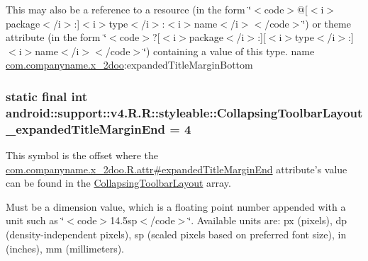This may also be a reference to a resource (in the form \char`\"{}$<$code$>$@\mbox{[}$<$i$>$package$<$/i$>$:\mbox{]}$<$i$>$type$<$/i$>$:$<$i$>$name$<$/i$>$$<$/code$>$\char`\"{}) or theme attribute (in the form \char`\"{}$<$code$>$?\mbox{[}$<$i$>$package$<$/i$>$:\mbox{]}\mbox{[}$<$i$>$type$<$/i$>$:\mbox{]}$<$i$>$name$<$/i$>$$<$/code$>$\char`\"{}) containing a value of this type.  name \hyperlink{namespacecom_1_1companyname_1_1x__2doo}{com.companyname.x\_\-2doo}:expandedTitleMarginBottom \hypertarget{classandroid_1_1support_1_1v4_1_1_r_1_1styleable_51a799757acf71b646e197b66d32c630}{
\subsubsection[{CollapsingToolbarLayout\_\-expandedTitleMarginEnd}]{\setlength{\rightskip}{0pt plus 5cm}static final int android::support::v4.R.R::styleable::CollapsingToolbarLayout\_\-expandedTitleMarginEnd = 4}}
\label{classandroid_1_1support_1_1v4_1_1_r_1_1styleable_51a799757acf71b646e197b66d32c630}


This symbol is the offset where the \hyperlink{classcom_1_1companyname_1_1x__2doo_1_1_r_1_1attr_c7cd763121dc0ab7771c30223b99a2cb}{com.companyname.x\_\-2doo.R.attr\#expandedTitleMarginEnd} attribute's value can be found in the \hyperlink{classandroid_1_1support_1_1v4_1_1_r_1_1styleable_aa101903fcf4b45a3b7fee0a0abc5ea8}{CollapsingToolbarLayout} array.

Must be a dimension value, which is a floating point number appended with a unit such as \char`\"{}$<$code$>$14.5sp$<$/code$>$\char`\"{}. Available units are: px (pixels), dp (density-independent pixels), sp (scaled pixels based on preferred font size), in (inches), mm (millimeters). 

